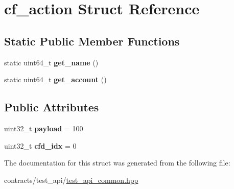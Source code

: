 \hypertarget{structcf__action}{}\section{cf\+\_\+action Struct Reference}
\label{structcf__action}
\subsection*{Static Public Member Functions}
\begin{DoxyCompactItemize}
\item 
\mbox{\label{structcf__action_a27e28c4a00780828baad8ff96a91c07d}} 
static uint64\+\_\+t {\bfseries get\+\_\+name} ()
\item 
\mbox{\label{structcf__action_a52038284fa3332402e3ddedb1980639b}} 
static uint64\+\_\+t {\bfseries get\+\_\+account} ()
\end{DoxyCompactItemize}
\subsection*{Public Attributes}
\begin{DoxyCompactItemize}
\item 
\mbox{\label{structcf__action_a6c44294dda50af9f2e7e5c60fb7d45bc}} 
uint32\+\_\+t {\bfseries payload} = 100
\item 
\mbox{\label{structcf__action_a3f1c6d61c4425b04499cb24176b2ff3a}} 
uint32\+\_\+t {\bfseries cfd\+\_\+idx} = 0
\end{DoxyCompactItemize}


The documentation for this struct was generated from the following file\+:\begin{DoxyCompactItemize}
\item 
contracts/test\+\_\+api/\mbox{\hyperlink{test__api__common_8hpp}{test\+\_\+api\+\_\+common.\+hpp}}\end{DoxyCompactItemize}
